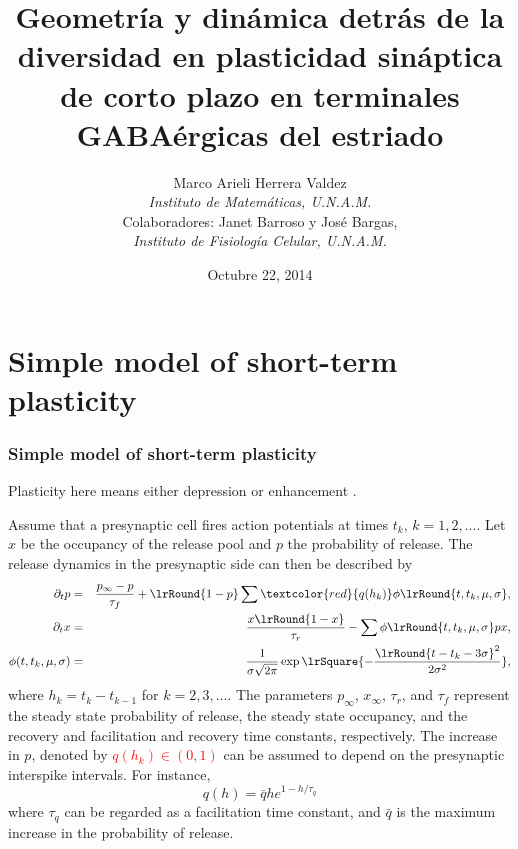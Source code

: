 \documentclass[8pt]{beamer}
\title[Geometría y dinámica de la plasticidad sináptica]{Geometría y
  dinámica detrás de la diversidad en plasticidad sináptica de corto
  plazo en terminales GABAérgicas del estriado}
\author[Marco Arieli Herrera Valdez]{Marco Arieli Herrera Valdez \\ 
\textit{Instituto de Matemáticas, U.N.A.M.}\\
\vspace{10pt}
\small{Colaboradores: Janet
    Barroso y José Bargas,\\
\textit{Instituto de Fisiología Celular, U.N.A.M.}}
}
\date{Octubre 22, 2014}
\begin{document}
\begin{frame}
\maketitle
\end{frame}

\section{Simple model of short-term plasticity}

\begin{frame}
\frametitle{Simple model of short-term plasticity}
Plasticity here means either depression or enhancement \citep{}.

Assume that a presynaptic cell fires action potentials at times $t_k$,
$k =1,2,...$. Let $x$ be the occupancy of the release pool and $p$ the
probability of release. The release dynamics in the presynaptic side
can then be described by 
\begin{eqnarray}
\partial_t p &=&\frac{p_{\infty}-p}{\tau_{f}} + \lrRound{1-p} \sum \textcolor{red}{q(h_k)}
\phi \lrRound{t,t_k,\mu,\sigma},
\label{eq:prelease}
\\
\partial_t x &=& \frac{x\lrRound{1-x}}{\tau_{r}} - \sum \phi
\lrRound{t,t_k,\mu,\sigma}  p x, 
\label{eq:occupancy}
\\
\phi(t,t_k,\mu,\sigma) &=& \frac{1}{\sigma \sqrt{2 \pi}} \exp
\lrSquare{- \frac{\lrRound{t-t_k -3 \sigma}^2}{2  \sigma^2}},
\label{eq:phi}
\end{eqnarray}
where $h_k=t_{k} -t_{k-1}$ for $k=2,3,...$. The parameters $p_{\infty}$,
$x_{\infty}$, $\tau_{r}$, and $\tau_{f}$ represent the 
steady state probability of release, the steady state occupancy, and the recovery and facilitation and
recovery time constants, respectively. The increase in $p$, denoted by
\textcolor{red}{$q(h_k) \in (0,1)$} can be assumed to depend on the presynaptic
interspike intervals. For instance, 
\begin{equation}
q(h)= \bar{q} h   e^{1- h/\tau_q}
\end{equation}
where $\tau_q$ can be regarded as a facilitation time constant, and
$\bar{q}$ is the maximum increase in the probability of release. 
\end{frame}
\end{document}
